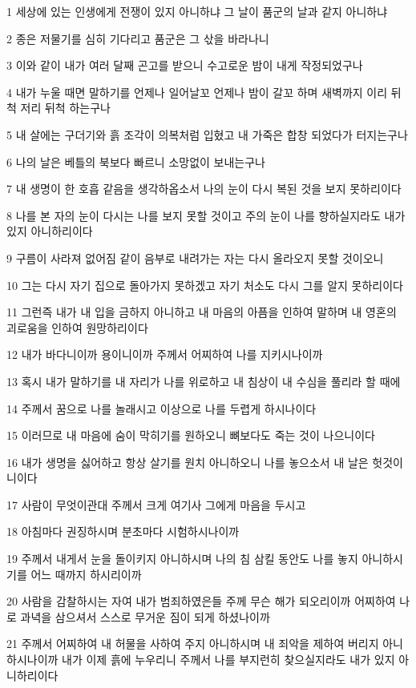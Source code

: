 \par 1 세상에 있는 인생에게 전쟁이 있지 아니하냐 그 날이 품군의 날과 같지 아니하냐
\par 2 종은 저물기를 심히 기다리고 품군은 그 삯을 바라나니
\par 3 이와 같이 내가 여러 달째 곤고를 받으니 수고로운 밤이 내게 작정되었구나
\par 4 내가 누울 때면 말하기를 언제나 일어날꼬 언제나 밤이 갈꼬 하며 새벽까지 이리 뒤척 저리 뒤척 하는구나
\par 5 내 살에는 구더기와 흙 조각이 의복처럼 입혔고 내 가죽은 합창 되었다가 터지는구나
\par 6 나의 날은 베틀의 북보다 빠르니 소망없이 보내는구나
\par 7 내 생명이 한 호흡 같음을 생각하옵소서 나의 눈이 다시 복된 것을 보지 못하리이다
\par 8 나를 본 자의 눈이 다시는 나를 보지 못할 것이고 주의 눈이 나를 향하실지라도 내가 있지 아니하리이다
\par 9 구름이 사라져 없어짐 같이 음부로 내려가는 자는 다시 올라오지 못할 것이오니
\par 10 그는 다시 자기 집으로 돌아가지 못하겠고 자기 처소도 다시 그를 알지 못하리이다
\par 11 그런즉 내가 내 입을 금하지 아니하고 내 마음의 아픔을 인하여 말하며 내 영혼의 괴로움을 인하여 원망하리이다
\par 12 내가 바다니이까 용이니이까 주께서 어찌하여 나를 지키시나이까
\par 13 혹시 내가 말하기를 내 자리가 나를 위로하고 내 침상이 내 수심을 풀리라 할 때에
\par 14 주께서 꿈으로 나를 놀래시고 이상으로 나를 두렵게 하시나이다
\par 15 이러므로 내 마음에 숨이 막히기를 원하오니 뼈보다도 죽는 것이 나으니이다
\par 16 내가 생명을 싫어하고 항상 살기를 원치 아니하오니 나를 놓으소서 내 날은 헛것이니이다
\par 17 사람이 무엇이관대 주께서 크게 여기사 그에게 마음을 두시고
\par 18 아침마다 권징하시며 분초마다 시험하시나이까
\par 19 주께서 내게서 눈을 돌이키지 아니하시며 나의 침 삼킬 동안도 나를 놓지 아니하시기를 어느 때까지 하시리이까
\par 20 사람을 감찰하시는 자여 내가 범죄하였은들 주께 무슨 해가 되오리이까 어찌하여 나로 과녁을 삼으셔서 스스로 무거운 짐이 되게 하셨나이까
\par 21 주께서 어찌하여 내 허물을 사하여 주지 아니하시며 내 죄악을 제하여 버리지 아니 하시나이까 내가 이제 흙에 누우리니 주께서 나를 부지런히 찾으실지라도 내가 있지 아니하리이다

